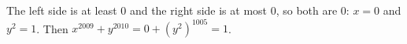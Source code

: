 The left side is at least $0$ and the right side is at most $0$, so both are $0$: $x=0$ and $y^2=1$. Then $x^{2009}+y^{2010}=0+(y^2)^{1005}=\boxed{1}$.
